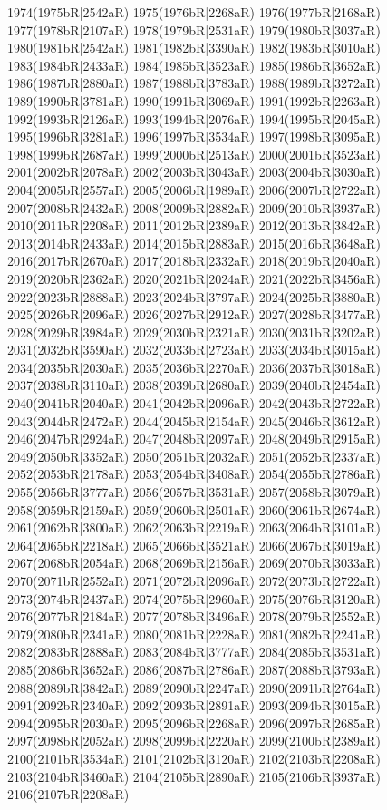1974(1975bR|2542aR) 1975(1976bR|2268aR) 1976(1977bR|2168aR) 1977(1978bR|2107aR) 1978(1979bR|2531aR) 1979(1980bR|3037aR) \\1980(1981bR|2542aR) 1981(1982bR|3390aR) 1982(1983bR|3010aR) 1983(1984bR|2433aR) 1984(1985bR|3523aR) 1985(1986bR|3652aR) 1986(1987bR|2880aR) 1987(1988bR|3783aR) 1988(1989bR|3272aR) \\1989(1990bR|3781aR) 1990(1991bR|3069aR) 1991(1992bR|2263aR) 1992(1993bR|2126aR) 1993(1994bR|2076aR) 1994(1995bR|2045aR) 1995(1996bR|3281aR) 1996(1997bR|3534aR) 1997(1998bR|3095aR) \\1998(1999bR|2687aR) 1999(2000bR|2513aR) 2000(2001bR|3523aR) 2001(2002bR|2078aR) 2002(2003bR|3043aR) 2003(2004bR|3030aR) 2004(2005bR|2557aR) 2005(2006bR|1989aR) 2006(2007bR|2722aR) \\2007(2008bR|2432aR) 2008(2009bR|2882aR) 2009(2010bR|3937aR) 2010(2011bR|2208aR) 2011(2012bR|2389aR) 2012(2013bR|3842aR) 2013(2014bR|2433aR) 2014(2015bR|2883aR) 2015(2016bR|3648aR) \\2016(2017bR|2670aR) 2017(2018bR|2332aR) 2018(2019bR|2040aR) 2019(2020bR|2362aR) 2020(2021bR|2024aR) 2021(2022bR|3456aR) 2022(2023bR|2888aR) 2023(2024bR|3797aR) 2024(2025bR|3880aR) \\2025(2026bR|2096aR) 2026(2027bR|2912aR) 2027(2028bR|3477aR) 2028(2029bR|3984aR) 2029(2030bR|2321aR) 2030(2031bR|3202aR) 2031(2032bR|3590aR) 2032(2033bR|2723aR) 2033(2034bR|3015aR) \\2034(2035bR|2030aR) 2035(2036bR|2270aR) 2036(2037bR|3018aR) 2037(2038bR|3110aR) 2038(2039bR|2680aR) 2039(2040bR|2454aR) 2040(2041bR|2040aR) 2041(2042bR|2096aR) 2042(2043bR|2722aR) \\2043(2044bR|2472aR) 2044(2045bR|2154aR) 2045(2046bR|3612aR) 2046(2047bR|2924aR) 2047(2048bR|2097aR) 2048(2049bR|2915aR) 2049(2050bR|3352aR) 2050(2051bR|2032aR) 2051(2052bR|2337aR) \\2052(2053bR|2178aR) 2053(2054bR|3408aR) 2054(2055bR|2786aR) 2055(2056bR|3777aR) 2056(2057bR|3531aR) 2057(2058bR|3079aR) 2058(2059bR|2159aR) 2059(2060bR|2501aR) 2060(2061bR|2674aR) \\2061(2062bR|3800aR) 2062(2063bR|2219aR) 2063(2064bR|3101aR) 2064(2065bR|2218aR) 2065(2066bR|3521aR) 2066(2067bR|3019aR) 2067(2068bR|2054aR) 2068(2069bR|2156aR) 2069(2070bR|3033aR) \\2070(2071bR|2552aR) 2071(2072bR|2096aR) 2072(2073bR|2722aR) 2073(2074bR|2437aR) 2074(2075bR|2960aR) 2075(2076bR|3120aR) 2076(2077bR|2184aR) 2077(2078bR|3496aR) 2078(2079bR|2552aR) \\2079(2080bR|2341aR) 2080(2081bR|2228aR) 2081(2082bR|2241aR) 2082(2083bR|2888aR) 2083(2084bR|3777aR) 2084(2085bR|3531aR) 2085(2086bR|3652aR) 2086(2087bR|2786aR) 2087(2088bR|3793aR) \\2088(2089bR|3842aR) 2089(2090bR|2247aR) 2090(2091bR|2764aR) 2091(2092bR|2340aR) 2092(2093bR|2891aR) 2093(2094bR|3015aR) 2094(2095bR|2030aR) 2095(2096bR|2268aR) 2096(2097bR|2685aR) \\2097(2098bR|2052aR) 2098(2099bR|2220aR) 2099(2100bR|2389aR) 2100(2101bR|3534aR) 2101(2102bR|3120aR) 2102(2103bR|2208aR) 2103(2104bR|3460aR) 2104(2105bR|2890aR) 2105(2106bR|3937aR) \\2106(2107bR|2208aR) 